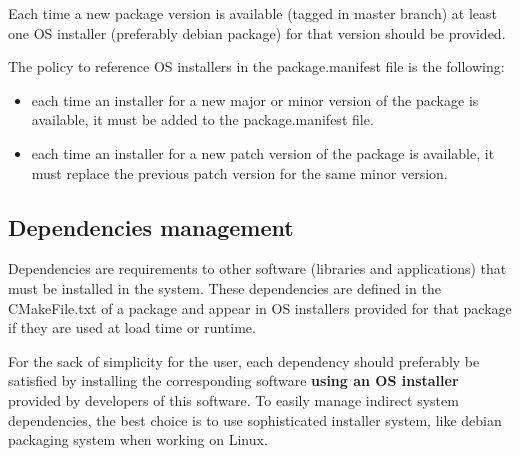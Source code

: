 \documentclass[12pt,a4paper]{article}
\begin{document}
Each time a new package version is available (tagged in master branch) at least one OS installer (preferably debian package) for that version should be provided.

The policy to reference OS installers in the package.manifest file is the following:
\begin{itemize}
\item each time an installer for a new major or minor version of the package is available, it must be added to the package.manifest file.
\item each time an installer for a new patch version of the package is available, it must replace the previous patch version for the same minor version.
\end{itemize}

\subsection{Dependencies management}

Dependencies are requirements to other software (libraries and applications) that must be installed in the system. These dependencies are defined in the CMakeFile.txt of a package and appear in OS installers provided for that package if they are used at load time or runtime. 

For the sack of simplicity for the user, each dependency should preferably be satisfied by installing the corresponding software \textbf{using an OS installer} provided by developers of this software. To easily manage indirect system dependencies, the best choice is to use sophisticated installer system, like debian packaging system when working on Linux.
\end{document}
